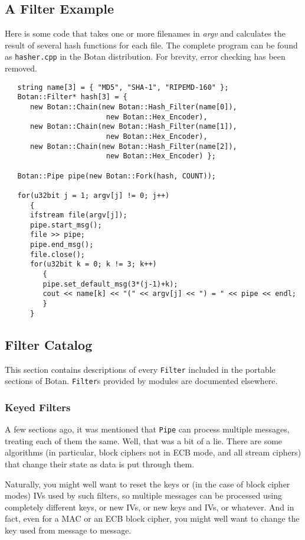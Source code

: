 \documentclass{article}
\newcommand{\filename}[1]{\texttt{#1}}
\newcommand{\type}[1]{\texttt{#1}}
\renewcommand{\arg}[1]{\textsl{#1}}
\begin{document}
\subsection{A Filter Example}

Here is some code that takes one or more filenames in \arg{argv} and
calculates the result of several hash functions for each file. The complete
program can be found as \filename{hasher.cpp} in the Botan distribution. For
brevity, error checking has been removed.

\begin{verbatim}
   string name[3] = { "MD5", "SHA-1", "RIPEMD-160" };
   Botan::Filter* hash[3] = {
      new Botan::Chain(new Botan::Hash_Filter(name[0]),
                        new Botan::Hex_Encoder),
      new Botan::Chain(new Botan::Hash_Filter(name[1]),
                        new Botan::Hex_Encoder),
      new Botan::Chain(new Botan::Hash_Filter(name[2]),
                        new Botan::Hex_Encoder) };

   Botan::Pipe pipe(new Botan::Fork(hash, COUNT));

   for(u32bit j = 1; argv[j] != 0; j++)
      {
      ifstream file(argv[j]);
      pipe.start_msg();
      file >> pipe;
      pipe.end_msg();
      file.close();
      for(u32bit k = 0; k != 3; k++)
         {
         pipe.set_default_msg(3*(j-1)+k);
         cout << name[k] << "(" << argv[j] << ") = " << pipe << endl;
         }
      }
\end{verbatim}


\subsection{Filter Catalog}

This section contains descriptions of every \type{Filter} included in
the portable sections of Botan. \type{Filter}s provided by modules
are documented elsewhere.

\subsubsection{Keyed Filters}

A few sections ago, it was mentioned that \type{Pipe} can process multiple
messages, treating each of them the same. Well, that was a bit of a
lie. There are some algorithms (in particular, block ciphers not in ECB mode,
and all stream ciphers) that change their state as data is put through them.

Naturally, you might well want to reset the keys or (in the case of block
cipher modes) IVs used by such filters, so multiple messages can be processed
using completely different keys, or new IVs, or new keys and IVs, or whatever.
And in fact, even for a MAC or an ECB block cipher, you might well want to
change the key used from message to message.
\end{document}
